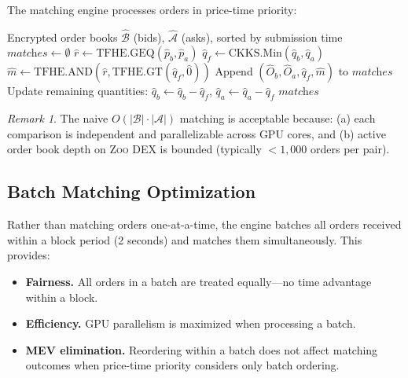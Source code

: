\documentclass[11pt,letterpaper]{article}
\theoremstyle{definition}
\theoremstyle{remark}
\newtheorem{remark}{Remark}
\newcommand{\Zoo}{\textsc{Zoo}}
\newcommand{\DEX}{\textsc{DEX}}
\begin{document}
The matching engine processes orders in price-time priority:

\begin{algorithm}
\caption{FHE Order Matching Engine}
\begin{algorithmic}[1]
\REQUIRE Encrypted order books $\hat{\mathcal{B}}$ (bids), $\hat{\mathcal{A}}$ (asks), sorted by submission time
\STATE $\textit{matches} \leftarrow \emptyset$
        \STATE $\hat{r} \leftarrow \text{TFHE.GEQ}(\hat{p}_b, \hat{p}_a)$ 
        \STATE $\hat{q}_f \leftarrow \text{CKKS.Min}(\hat{q}_b, \hat{q}_a)$ 
        \STATE $\hat{m} \leftarrow \text{TFHE.AND}(\hat{r}, \text{TFHE.GT}(\hat{q}_f, \hat{0}))$ 
        \STATE Append $(\hat{O}_b, \hat{O}_a, \hat{q}_f, \hat{m})$ to $\textit{matches}$
            \STATE Update remaining quantities: $\hat{q}_b \leftarrow \hat{q}_b - \hat{q}_f$, $\hat{q}_a \leftarrow \hat{q}_a - \hat{q}_f$
        \ENDIF
    \ENDFOR
\ENDFOR
\RETURN $\textit{matches}$
\end{algorithmic}
\end{algorithm}

\begin{remark}
The naive $O(|\mathcal{B}| \cdot |\mathcal{A}|)$ matching is acceptable because: (a) each comparison is independent and parallelizable across GPU cores, and (b) active order book depth on \Zoo{} \DEX{} is bounded (typically $< 1{,}000$ orders per pair).
\end{remark}

\subsection{Batch Matching Optimization}

Rather than matching orders one-at-a-time, the engine batches all orders received within a block period (2 seconds) and matches them simultaneously. This provides:

\begin{itemize}
    \item \textbf{Fairness.} All orders in a batch are treated equally---no time advantage within a block.
    \item \textbf{Efficiency.} GPU parallelism is maximized when processing a batch.
    \item \textbf{MEV elimination.} Reordering within a batch does not affect matching outcomes when price-time priority considers only batch ordering.
\end{itemize}
\end{document}
